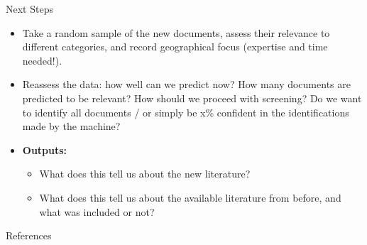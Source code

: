 \documentclass[9pt]{beamer}
\begin{document}
\begin{frame}{Next Steps}

\begin{itemize}
	\item<1-> Take a random sample of the new documents, assess their relevance to different categories, and record geographical focus (expertise and time needed!).
	\item<2-> Reassess the data: how well can we predict now? How many documents are predicted to be relevant? How should we proceed with screening? Do we want to identify all documents / or simply be x\% confident in the identifications made by the machine?
	
	\item<3->\textbf{Outputs:}
	\begin{itemize}
		\item What does this tell us about the new literature?
		\item What does this tell us about the available literature from before, and what was included or not?
	\end{itemize}
\end{itemize}

\end{frame}

\begin{frame}{References}

\end{frame}
\end{document}
